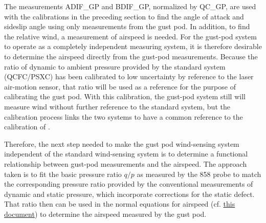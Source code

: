 \documentclass[12pt,twoside,english]{article}\usepackage[]{graphicx}\usepackage[]{color}
\let\OrgIndex\index
\renewcommand*{\index}[1]{\OrgIndex{#1}}
\begin{document}

The measurements ADIF\_GP and BDIF\_GP, normalized by QC\_GP, are used with the calibrations in the preceding section to find the angle of attack and sideslip angle using only measurements from the gust pod. In addition, to find the relative wind, a measurement of airspeed is needed. For the gust-pod system to operate as a completely independent measuring system, it is therefore desirable to determine the  airspeed directly from the gust-pod measurements. Because the ratio of dynamic to ambient pressure provided by the standard system (QCFC/PSXC) has been calibrated to low uncertainty by reference to the laser air-motion sensor, that ratio will be used as a reference for the purpose of calibrating the gust pod. With this calibration, the gust-pod system still will measure wind without further reference to the standard system, but the calibration process links the two systems to have a common reference to the calibration of \citet{CooperEtAl2014}. 

Therefore, the next step needed to make the gust pod wind-sensing system independent of the standard wind-sensing system is to determine a functional relationship between gust-pod measurements and the airspeed. The approach taken is to fit the basic pressure ratio $q/p$ as measured by the 858 probe to match the corresponding pressure ratio provided by the conventional measurements of dynamic and static pressure, which incorporate corrections for the static defect. That ratio then can be used in the normal equations for airspeed (cf. \href{https://drive.google.com/open?id=0B1kIUH45ca5Ab2Z6cld1M1cydjA&authuser=0}{this document}) to determine the airspeed measured by the gust pod. 
\end{document}
